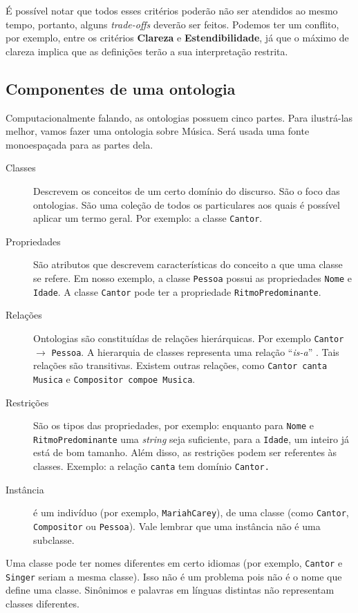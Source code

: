 É possível notar que todos esses critérios poderão não ser atendidos ao mesmo tempo, portanto, alguns \textit{trade-offs} deverão ser feitos.
Podemos ter um conflito, por exemplo, entre os critérios \textbf{Clareza} e \textbf{Estendibilidade}, já que o máximo de clareza implica que as definições terão a sua interpretação restrita.

\subsection{Componentes de uma ontologia}

Computacionalmente falando, as ontologias possuem cinco partes. Para ilustrá-las melhor, vamos fazer uma ontologia sobre Música. Será usada uma fonte monoespaçada para as partes dela.

\begin{description}
	\item[Classes] Descrevem os conceitos de um certo domínio do discurso. São o foco das ontologias. São uma coleção de todos os particulares aos quais é possível aplicar um termo geral. Por exemplo: a classe \texttt{Cantor}.
	\item[Propriedades] São atributos que descrevem características do conceito a que uma classe se refere. Em nosso exemplo, a classe \texttt{Pessoa} possui as propriedades \texttt{Nome} e \texttt{Idade}. A classe \texttt{Cantor} pode ter a propriedade \texttt{RitmoPredominante}.
	\item[Relações] Ontologias são constituídas de relações hierárquicas. Por exemplo \texttt{Cantor} $ \to $ \texttt{Pes\-so\-a}. A hierarquia de classes representa uma relação “\textit{is-a}” \citep{ontoFranca}. Tais relações são transitivas. Existem outras relações, como \texttt{Cantor canta Musica} e \texttt{Compositor compoe Musica}.
	\item[Restrições] São os tipos das propriedades, por exemplo: enquanto para \texttt{Nome} e \texttt{Ritmo\-Pre\-do\-mi\-nan\-te} uma \textit{string} seja suficiente, para a \texttt{Idade}, um inteiro já está de bom tamanho. Além disso, as restrições podem ser referentes às classes. Exemplo: a relação \texttt{canta} tem domínio \texttt{Cantor.}
	\item[Instância] é um indivíduo (por exemplo, \texttt{MariahCarey}), de uma classe (como \texttt{Cantor}, \texttt{Com\-po\-si\-tor} ou \texttt{Pessoa}). Vale lembrar que uma instância não é uma subclasse.
\end{description}

Uma classe pode ter nomes diferentes em certo idiomas (por exemplo, \texttt{Cantor} e \texttt{Singer} seriam a mesma classe). Isso não é um problema pois não é o nome que define uma classe. Sinônimos e palavras em línguas distintas não representam classes diferentes.

